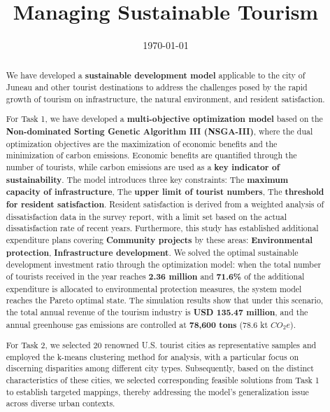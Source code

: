 \documentclass{mcmthesis}
\title{Managing Sustainable Tourism}
\date{\today}
\begin{document}
\begin{abstract}

  We have developed a \textbf{sustainable development model} applicable to the city of Juneau and 
other tourist destinations to address the challenges posed by the rapid growth of tourism
on infrastructure, the natural environment, and resident satisfaction.\par  
For Task 1, we have developed a \textbf{multi-objective optimization model} based on the 
\textbf{Non-dominated Sorting Genetic Algorithm III (NSGA-III)}, where the dual optimization 
objectives are the maximization of economic benefits and the minimization of carbon emissions. 
Economic benefits are quantified through the number of tourists, while carbon emissions 
are used as a \textbf{key indicator of sustainability}. The model introduces three key constraints:  
The \textbf{maximum capacity of infrastructure},
The \textbf{upper limit of tourist numbers},
The \textbf{threshold for resident satisfaction}.
Resident satisfaction is derived from a weighted analysis of dissatisfaction data in the 
survey report, with a 
limit set based on the actual 
dissatisfaction rate of recent years. 
Furthermore, this study has established additional 
expenditure plans covering \textbf{Community projects} by these areas:
\textbf{Environmental protection},
\textbf{Infrastructure development}. 
We solved the optimal sustainable development investment ratio through the optimization model: when the total number of tourists received in the year reaches \textbf{2.36 million} and \textbf{71.6\%} of the additional expenditure is allocated to environmental protection measures, the system model reaches the Pareto optimal state. The simulation results show that under this scenario, the total annual revenue of the tourism industry is \textbf{USD 135.47 million}, and the annual greenhouse gas emissions are controlled at \textbf{78,600 tons} (78.6 kt $CO_2e$).\par
For Task 2, we selected 20 renowned U.S. tourist cities as representative samples and employed the k-means clustering method for analysis, with a particular focus on discerning disparities among different city types. Subsequently, based on the distinct characteristics of these cities, we selected corresponding feasible solutions from Task 1 to establish targeted mappings, thereby addressing the model's generalization issue across diverse urban contexts.\par


\end{abstract}
\end{document}
